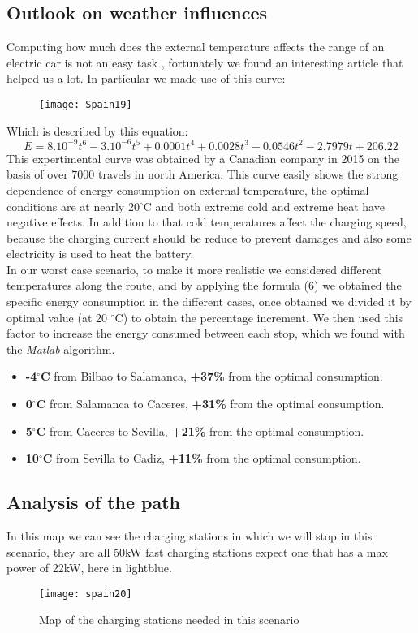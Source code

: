 \documentclass{article}
\begin{document}
\subsection{Outlook on weather influences}
Computing how much does the external temperature affects the range of an electric car is not an easy task , fortunately we found an interesting article \cite{bulgaria}  that helped us a lot.
In particular we made use of this curve:
\begin{figure}[H]
{\centering
\texttt{[image: Spain19]}
\caption{}}
\end{figure}
Which is described by this equation:
\begin{equation}
E= 8.10^{-9}t^{6}-3.10^{-6}t^{5}+0.0001t^{4}+0.0028t^{3}-0.0546t^{2}-2.7979t+206.22
\end{equation}
This expertimental curve was obtained by a Canadian company in 2015 on the basis of over 7000 travels in north America.\cite{canada}
This curve easily shows the strong dependence of energy consumption on external temperature, the optimal conditions are at nearly 20$^{\circ}$C and both extreme cold and extreme heat have negative effects. In addition to that cold temperatures affect the charging speed, because the charging current should be reduce to prevent damages and also some electricity is used to heat the battery.\\
In our worst case scenario, to make it more realistic we considered different temperatures along the route, and by applying the formula (6) we obtained the specific energy consumption in the different cases, once obtained we divided it by optimal value (at 20 $^{\circ}$C) to obtain the percentage increment. We then used this factor to increase the energy consumed between each stop, which we found with the \textit{Matlab} algorithm.
\begin{itemize}
\item \textbf{-4$^{\circ}$C} from Bilbao to Salamanca, \textbf{+37\%} from the optimal consumption.
\item \textbf{0$^{\circ}$C} from Salamanca to Caceres, \textbf{+31\%} from the optimal consumption.
\item \textbf{5$^{\circ}$C} from Caceres to Sevilla, \textbf{+21\%} from the optimal consumption.
\item \textbf{10$^{\circ}$C} from Sevilla to Cadiz, \textbf{+11\%} from the optimal consumption.
\end{itemize}
\subsection{Analysis of the path}
In this map we can see the charging stations in which we will stop in this scenario, they are all 50kW fast charging stations expect one that has a max power of 22kW, here in lightblue.
\begin{figure}[H]
{\centering
\texttt{[image: spain20]}
\caption{Map of the charging stations needed in this scenario}}
\end{figure}
\end{document}
